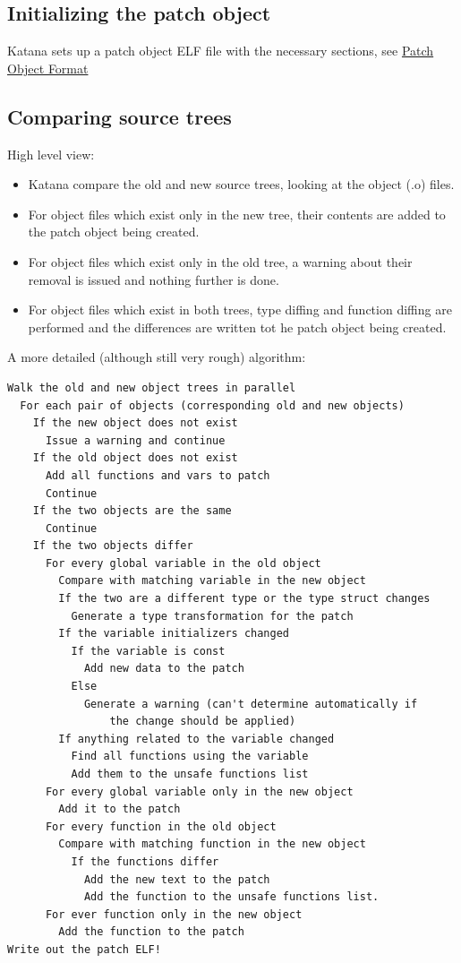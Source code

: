 \documentclass[11pt]{article}
\begin{document}
\subsection{Initializing the patch object}
\label{sec-3.9}

   Katana sets up a patch object ELF file with the necessary sections,
   see \hyperref[sec-3.6]{Patch Object Format}
\subsection{Comparing source trees}
\label{sec-3.10}

   High level view:
\begin{itemize}
\item Katana compare the old and new source trees, looking at the object (.o)
     files.
\item For object files which exist only in the new tree, their contents
     are added to the patch object being created.
\item For object files which exist only in the old tree, a warning
     about their removal is issued and nothing further is done.
\item For object files which exist in both trees, type diffing and
     function diffing are performed and the differences are written
     tot he patch object being created.
\end{itemize}
   A more detailed (although still very rough) algorithm:

\begin{verbatim}
Walk the old and new object trees in parallel
  For each pair of objects (corresponding old and new objects)
    If the new object does not exist
      Issue a warning and continue
    If the old object does not exist
      Add all functions and vars to patch
      Continue
    If the two objects are the same
      Continue
    If the two objects differ
      For every global variable in the old object
        Compare with matching variable in the new object
        If the two are a different type or the type struct changes
          Generate a type transformation for the patch
        If the variable initializers changed
          If the variable is const
            Add new data to the patch
          Else
            Generate a warning (can't determine automatically if
                the change should be applied)
        If anything related to the variable changed
          Find all functions using the variable
          Add them to the unsafe functions list
      For every global variable only in the new object
        Add it to the patch
      For every function in the old object
        Compare with matching function in the new object
          If the functions differ
            Add the new text to the patch
            Add the function to the unsafe functions list.
      For ever function only in the new object
        Add the function to the patch
Write out the patch ELF!
\end{verbatim}
\end{document}
